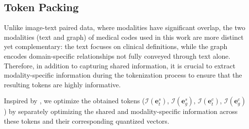 \subsection{Token Packing}
Unlike image-text paired data, where modalities have significant overlap, the two modalities (text and graph) of medical codes used in this work are more distinct yet complementary: the text focuses on clinical definitions, while the graph encodes domain-specific relationships not fully conveyed through text alone. Therefore, in addition to capturing shared information, it is crucial to extract modality-specific information during the tokenization process to ensure that the resulting tokens are highly informative.

Inspired by \cite{wang2024information}, we optimize the obtained tokens ($\mathcal{I}(\mathbf{e}_{t}^{s})$, $\mathcal{I}(\mathbf{e}_{g}^{s})$, $\mathcal{I}(\mathbf{e}_{t}^{c})$, $\mathcal{I}(\mathbf{e}_{g}^{c})$) by separately optimizing the shared and modality-specific information across these tokens and their corresponding quantized vectors. 

